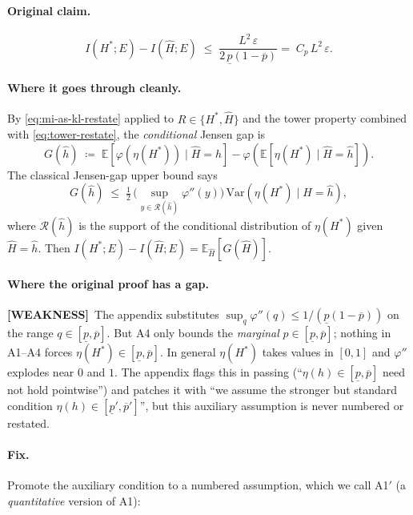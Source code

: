 \documentclass[11pt]{article}
\newcommand{\E}{\mathbb{E}}
\newcommand{\Var}{\mathrm{Var}}
\newcommand{\WEAK}{{\color{red!60!black}\textbf{[WEAKNESS]}}}
\begin{document}
\paragraph{Original claim.}
\begin{equation}\label{eq:jensen-restate}
I(H^*;E)-I(\hat H;E)\;\le\;\frac{L^2\,\varepsilon}{2\,\underline p(1-\overline p)}
=\;C_p\,L^2\,\varepsilon.
\end{equation}

\paragraph{Where it goes through cleanly.}
By \eqref{eq:mi-as-kl-restate} applied to $R\in\{H^*,\hat H\}$ and the
tower property combined with \eqref{eq:tower-restate}, the
\emph{conditional} Jensen gap is
\begin{equation}\label{eq:jensen-cond}
G(\hat h)\;\coloneqq\;
\E[\varphi(\eta(H^*))\mid \hat H=\hat h]
- \varphi(\E[\eta(H^*)\mid \hat H=\hat h]).
\end{equation}
The classical Jensen-gap upper bound \citep[Prop.~1]{liao2019sharpening} says
\begin{equation}\label{eq:liao}
G(\hat h)\;\le\;\tfrac12\,\bigl(\sup_{y\in\mathcal R(\hat h)}\varphi''(y)\bigr)
\,\Var(\eta(H^*)\mid \hat H=\hat h),
\end{equation}
where $\mathcal R(\hat h)$ is the support of the conditional distribution
of $\eta(H^*)$ given $\hat H=\hat h$. Then
$I(H^*;E)-I(\hat H;E)=\E_{\hat H}[G(\hat H)]$.

\paragraph{Where the original proof has a gap.}
\WEAK\ The appendix substitutes $\sup_q\varphi''(q)\le 1/(\underline p(1-\overline p))$
on the range $q\in[\underline p,\overline p]$. But A4 only bounds the
\emph{marginal} $p\in[\underline p,\overline p]$; nothing in A1--A4 forces
$\eta(H^*)\in[\underline p,\overline p]$. In general $\eta(H^*)$ takes
values in $[0,1]$ and $\varphi''$ explodes near $0$ and $1$. The
appendix flags this in passing (``$\eta(h)\in[\underline p,\overline p]$
need not hold pointwise'') and patches it with ``we assume the stronger
but standard condition $\eta(h)\in[\underline p',\overline p']$'', but this
auxiliary assumption is never numbered or restated.

\paragraph{Fix.} Promote the auxiliary condition to a numbered assumption,
which we call A1$'$ (a \emph{quantitative} version of A1):
\end{document}
